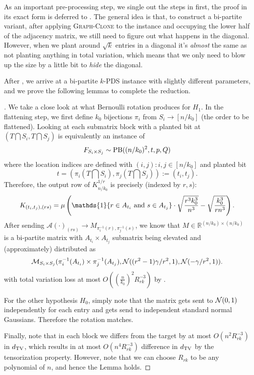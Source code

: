 \documentclass[final,12pt]{colt2023} %
\newcommand\1[1]{\mathbb{I}_{\left\{#1\right\}}}
\newcommand{\one}{\mathds{1}}
\begin{document}
As an important pre-processing step, we single out the steps in  first, the proof in its exact form is deferred to \cite{BB20}. The general idea is that, to construct a bi-partite variant, after applying \textsc{Graph-Clone} to the instance and occupying the lower half of the adjacency matrix, we still need to figure out what happens in the diagonal. However, when we plant around $\sqrt{k}$ entries in a diagonal it's \emph{almost} the same as not planting anything in total variation, which means that we only need to blow up the size by a little bit to \emph{hide} the diagonal.

\spac 
After , we arrive at a bi-partite $k$-PDS instance with slightly different parameters, and we prove the following lemmas to complete the reduction.
\begin{proof}[]
We take a close look at what Bernoulli rotation produces for $H_1$. In the flattening step, we first define $k_0$ bijections $\pi_i$ from $S_i\to [n/k_0]$ (the order to be flattened). Looking at each submatrix block with a planted bit at $(T\bigcap S_i, T\bigcap S_j)$ is equivalently an instance of $$F_{S_i\times S_j}\sim \textup{PB}((n/k_0)^2, t, p, Q)$$ where the location indices are defined with $(i, j): i, j\in [n/k_0]$ and planted bit $$t=(\pi_i(T\bigcap S_i), \pi_j(T\bigcap S_j)):= (t_i, t_j).$$ Therefore, the output row of $K_{n/k_0}^{1/r}$ is precisely (indexed by $r, s$):$$K_{(t_i, t_j), (rs)}=\mu\left(\one\{r\in A_{t_i} \textup{ and } s\in A_{t_j}\}\cdot \sqrt{\frac{r^3k_0^3}{n^3}}-\sqrt{\frac{k_0^3}{rn^3}}\right).$$ After sending $\mathcal{A}(\cdot)_{(rs)}\to M_{\pi_i^{-1}(r), \pi_j^{-1}(s)}$, we know that 
$M\in\mathbb{R}^{(n/k_0)\times (n/k_0)}$ is a bi-partite matrix with $A_{t_i}\times A_{t_j}$ submatrix being elevated and (approximately) distributed as 
$$\mathcal{M}_{S_i\times S_j}(\pi_i^{-1}(A_{t_i})\times \pi_j^{-1}(A_{t_j}), \mathcal{N}((r^2-1)\gamma/r^2, 1), \mathcal{N}(-\gamma/r^2, 1)).$$with total variation loss at most $O((\frac{n}{k_0})^2R_{rk}^{-3})$ by  .

\spac For the other hypothesis $H_0$, simply note that the matrix gets sent to $\mathcal{N}(0, 1)$ independently for each entry and gets send to independent standard normal Gaussians. Therefore the rotation matches.

\spac Finally, note that in each block we differs from the target by at most $O(n^2R_{rk}^{-3})$ in $d_{\rm TV}$, which results in at most $O(n^4R_{rk}^{-3})$ difference in $d_{\rm TV}$ by the tensorization property. However, note that we can choose $R_{rk}$ to be any polynomial of $n$, and hence the Lemma holds.
\end{proof}
\end{document}
